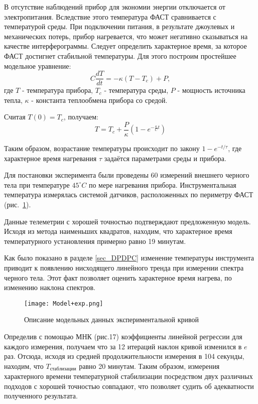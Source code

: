 \documentclass{mipt-thesis-bs}
\begin{document}
	 В отсутствие наблюдений прибор для экономии энергии отключается от электропитания. Вследствие этого температура ФАСТ сравнивается с температурой среды. При подключении питания, в результате джоулевых и механических потерь, прибор нагревается, что может негативно сказываться на качестве интерферограммы. Следует определить характерное время, за которое ФАСТ достигнет стабильной температуры. Для этого построим простейшее модельное уравнение:
	 $$C \frac{dT}{dt}=-\kappa(T-T_c)+P,$$
	где $T$ - температура прибора, $T_c$ - температура среды, $P$ - мощность источника тепла, $\kappa$ - константа теплообмена прибора со средой. 
	
	Считая $T(0)=T_c$, получаем:
	\begin{equation}
	T=T_c+\frac{P}{\kappa} \left(1-e^{-\frac{\kappa}{C}t}\right) 
	\end{equation}

	Таким образом, возрастание температуры происходит по закону $1-e^{-t/\tau}$, где характерное время нагревания $\tau$ задаётся параметрами среды и прибора.

	
	Для постановки эксперимента были проведены 60 измерений внешнего черного тела при температуре $45^\circ C$ по мере нагревания прибора. Инструментальная температура измерялась системой датчиков, расположенных по периметру ФАСТ  (рис.~\ref{fig_modeldata}).
	 
	 Данные телеметрии с хорошей точностью подтверждают предложенную модель. Исходя из метода наименьших квадратов, находим, что  характерное время температурного установления примерно равно 19 минутам.


	
	Как было показано в разделе \ref{sec_DPDPC} изменение температуры инструмента приводит к появлению нисходящего линейного тренда при измерении спектра черного тела. Этот факт позволяет оценить характерное время нагрева, по изменению наклона спектров.
	
		\begin{figure}[h!]
		\centering
		\texttt{[image: Model+exp.png]}
		\caption{Описание модельных данных экспериментальной кривой}
		\label{fig_modeldata}
	\end{figure}
	
 Определив с помощью МНК (рис.17) коэффициенты линейной регрессии для каждого измерения, получаем что за 12 итераций наклон кривой изменился в $e$ раз. Отсюда, исходя из средней продолжительности измерения в 104 секунды, находим, что $T_{стаблизации}$ равно 20 минутам. Таким образом, измерения характерного времени температурной стабилизации посредством двух различных подходов с хорошей точностью совпадают, что позволяет судить об адекватности полученного результата.  
 
\end{document}

